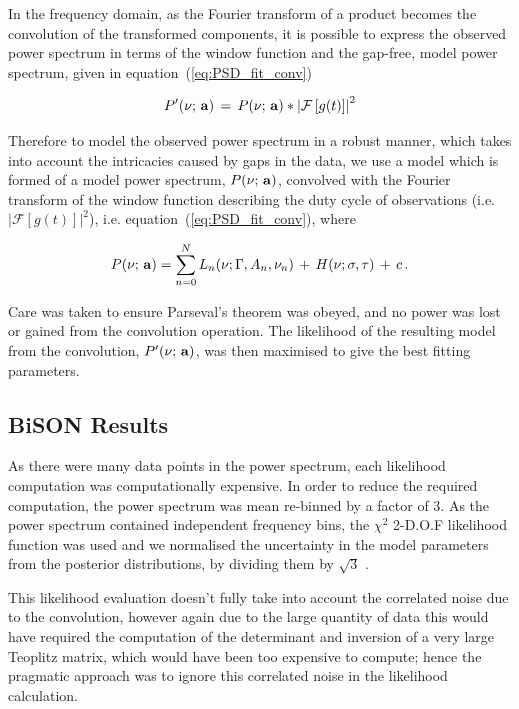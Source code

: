 In the frequency domain, as the Fourier transform of a product becomes the convolution of the transformed components, it is possible to express the observed power spectrum in terms of the window function and the gap-free, model power spectrum, given in equation~(\ref{eq:PSD_fit_conv})

\begin{equation}
P'(\nu; \,{\bf a}) \, = \, P(\nu; \,{\bf a}) * \left|\mathcal{F}\left[g(t)\right]\right|^2
\label{eq:PSD_fit_conv}
\end{equation}

Therefore to model the observed power spectrum in a robust manner, which takes into account the intricacies caused by gaps in the data, we use a model which is formed of a model power spectrum, $P(\nu; \,{\bf a})$, convolved with the Fourier transform of the window function describing the duty cycle of observations (i.e. $\left|\mathcal{F}\left[g(t)\right]\right|^2$), i.e. equation~(\ref{eq:PSD_fit_conv}), where


\begin{equation}
P(\nu; \,{\bf a}) = \sum_{n=0}^{N} L_n(\nu; \Gamma, A_n, \nu_n) \, + \, H(\nu; \sigma, \tau) \, + \, c \, .
\label{eq:PSD_model}
\end{equation}

Care was taken to ensure Parseval's theorem was obeyed, and no power was lost or gained from the convolution operation. The likelihood of the resulting model from the convolution, $P'(\nu; \,{\bf a})$, was then maximised to give the best fitting parameters.





\subsection{BiSON Results}\label{sec:BiSON_reults}

As there were many data points in the power spectrum, each likelihood computation was computationally expensive. In order to reduce the required computation, the power spectrum was mean re-binned by a factor of 3. As the power spectrum contained independent frequency bins, the $\chi^2$ 2-D.O.F likelihood function was used and we normalised the uncertainty in the model parameters from the posterior distributions, by dividing them by $\sqrt{3}$ \citep{appourchaux_maximum_2003}. 

This likelihood evaluation doesn't fully take into account the correlated noise due to the convolution, however again due to the large quantity of data this would have required the computation of the determinant and inversion of a very large Teoplitz matrix, which would have been too expensive to compute; hence the pragmatic approach was to ignore this correlated noise in the likelihood calculation.

